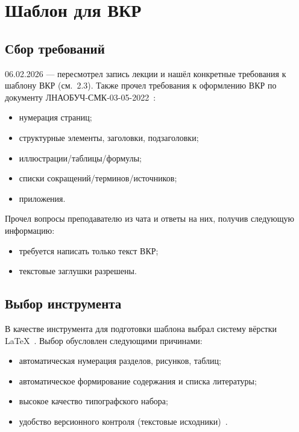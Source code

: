 \documentclass[a4paper,14pt]{extarticle}
\begin{document}
\newpage

\section{Шаблон для ВКР}

\subsection{Сбор требований}

06.02.2026 --- пересмотрел запись лекции и нашёл конкретные требования к шаблону ВКР (см.~2.3). Также прочел требования к оформлению ВКР по документу ЛНАОБУЧ-СМК-03-05-2022~\cite{gost732}:
\begin{itemize}
  \item нумерация страниц;
  \item структурные элементы, заголовки, подзаголовки;
  \item иллюстрации/таблицы/формулы;
  \item списки сокращений/терминов/источников;
  \item приложения.
\end{itemize}

Прочел вопросы преподавателю из чата и ответы на них, получив следующую информацию:
\begin{itemize}
  \item требуется написать только текст ВКР;
  \item текстовые заглушки разрешены.
\end{itemize}

\subsection{Выбор инструмента}

В качестве инструмента для подготовки шаблона выбрал систему вёрстки \LaTeX{}~\cite{latex_project}. Выбор обусловлен следующими причинами:
\begin{itemize}
  \item автоматическая нумерация разделов, рисунков, таблиц;
  \item автоматическое формирование содержания и списка литературы;
  \item высокое качество типографского набора;
  \item удобство версионного контроля (текстовые исходники)~\cite{lvovsky2003}.
\end{itemize}
\end{document}

